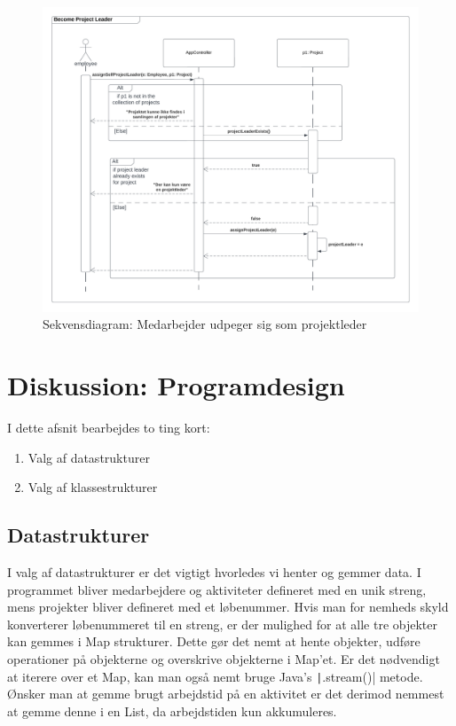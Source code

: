 \begin{figure}[H]
    \centering
    \caption{Sekvensdiagram: Medarbejder udpeger sig som projektleder}\label{fig:becomeProjectLeader}
    \includegraphics[width = 1\textwidth]{Diagrams/Become Project Leader.png}
\end{figure}
\newpage
\section{Diskussion: Programdesign}
I dette afsnit bearbejdes to ting kort:
\begin{enumerate}
    \item Valg af datastrukturer
    \item Valg af klassestrukturer
\end{enumerate}
\subsection{Datastrukturer} I valg af datastrukturer er det vigtigt hvorledes vi henter og gemmer data. I programmet bliver medarbejdere og aktiviteter defineret med en unik streng, mens projekter bliver defineret med et løbenummer. Hvis man for nemheds skyld konverterer løbenummeret til en streng, er der mulighed for at alle tre objekter kan gemmes i Map strukturer. Dette gør det nemt at hente objekter, udføre operationer på objekterne og overskrive objekterne i Map'et. Er det nødvendigt at iterere over et Map, kan man også nemt bruge Java's \texttt|.stream()| metode. Ønsker man at gemme brugt arbejdstid på en aktivitet er det derimod nemmest at gemme denne i en List, da arbejdstiden kun akkumuleres.
